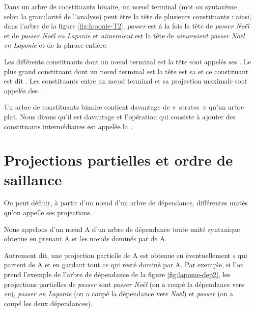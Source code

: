 Dans un arbre de constituants binaire, un nœud terminal (mot ou syntaxème selon la granularité de l’analyse) peut être la tête de plusieurs constituants : ainsi, dans l'arbre de la figure \ref{fig:laponie-T2}, \textit{passer} est à la fois la tête de \textit{passer Noël} et de \textit{passer Noël en Laponie} et \textit{aimeraient} est la tête de \textit{aimeraient passer Noël en Laponie} et de la phrase entière. 

{Les différents constituants dont un nœud terminal est la tête sont appelés ses . Le plus grand constituant dont un nœud terminal est la tête est sa  et ce constituant est dit . Les constituants entre un nœud terminal et sa projection maximale sont appelés des .}

{Un arbre de constituants binaire contient davantage de «~strates~» qu’un arbre plat. Nous dirons qu’il est davantage  et l’opération qui consiste à ajouter des constituants intermédiaires est appelée la .}

\section{Projections partielles et ordre de saillance}\label{sec:3.4.15}

On peut définir, à partir d'un nœud d'un arbre de dépendance, différentes unités qu'on appelle ses projections. 

{Nous appelons  d’un nœud A d'un arbre de dépendance toute unité syntaxique obtenue en prenant A et les nœuds dominés par  de A.}

Autrement dit, une projection partielle de A est obtenue en  éventuellement s qui partent de A et en gardant tout ce qui resté dominé par A. Par exemple, si l'on prend l'exemple de l'arbre de dépendance de la figure \ref{fig:laponie-dep2}, les projections partielles de \textit{passer} sont \textit{passer Noël} (on a coupé la dépendance vers \textit{en}), \textit{passer en Laponie} (on a coupé la dépendance vers \textit{Noël}) et \textit{passer} (on a coupé les deux dépendances).

